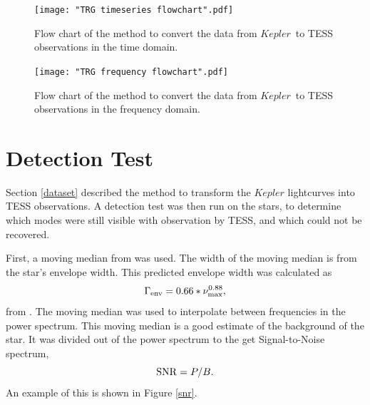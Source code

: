 \documentclass[a4paper,fleqn,usenatbib,useAMS]{mnras}
\newcommand{\numax}{\ensuremath{\nu_{\textrm{max}}}}
\newcommand{\kep}{\ensuremath{Kepler}}
\begin{document}
\onecolumn
\begin{figure}
	\centering
	\texttt{[image: "TRG timeseries flowchart".pdf]}
	\caption{Flow chart of the method to convert the data from \kep \ to TESS observations in the time domain.}	
	\label{ts flowchart}
\end{figure} 

\begin{figure}
	\centering
	\texttt{[image: "TRG frequency flowchart".pdf]}
	\caption{Flow chart of the method to convert the data from \kep \ to TESS observations in the frequency domain.}	
	\label{fr flowchart}
\end{figure}
\newpage
\twocolumn


\section{Detection Test}
\label{det_test}

Section \ref{dataset} described the method to transform the $Kepler$ lightcurves into TESS observations. A detection test was then run on the stars, to determine which modes were still visible with observation by TESS, and which could not be recovered.

First, a moving median from \citet{davies_asteroseismology_2016} was used. The width of the moving median is from the star's envelope width. This predicted envelope width was calculated as
\begin{equation}
\Gamma_{\rm env} = 0.66 * \numax^{0.88},
\end{equation}
from \citet{mosser_characterization_2012}. The moving median was used to interpolate between frequencies in the power spectrum. This moving median is a good estimate of the background of the star. It was divided out of the power spectrum to the get Signal-to-Noise spectrum,
\begin{equation}
\label{eq:snr}
{\rm SNR} = P/B.
\end{equation}
An example of this is shown in Figure \ref{snr}.
\end{document}
